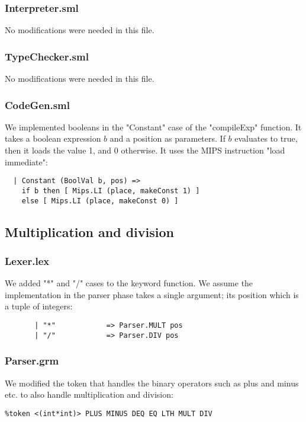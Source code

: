 \documentclass[12pt]{article}
\begin{document}
\subsubsection{Interpreter.sml}
No modifications were needed in this file. 
\subsubsection{TypeChecker.sml}
No modifications were needed in this file.
\subsubsection{CodeGen.sml}
We implemented booleans in the "Constant" case of the "compileExp" function. It takes a boolean expression \(b\) and a position as parameters. If \(b\) evaluates to true, then it loads the value 1, and 0 otherwise. It uses the MIPS instruction "load immediate": 
\begin{verbatim}
  | Constant (BoolVal b, pos) =>
    if b then [ Mips.LI (place, makeConst 1) ]
    else [ Mips.LI (place, makeConst 0) ]
\end{verbatim}
\subsection{Multiplication and division}
\subsubsection{Lexer.lex}
We added "*" and "/" cases to the keyword function. We assume the implementation in the parser phase takes a single argument; its position which is a tuple of integers:
\begin{verbatim}
       | "*"            => Parser.MULT pos
       | "/"            => Parser.DIV pos
\end{verbatim}
\subsubsection{Parser.grm}
We modified the token that handles the binary operators such as plus and minus etc. to also handle multiplication and division: 
\begin{verbatim}
%token <(int*int)> PLUS MINUS DEQ EQ LTH MULT DIV 
\end{verbatim}
\end{document}
